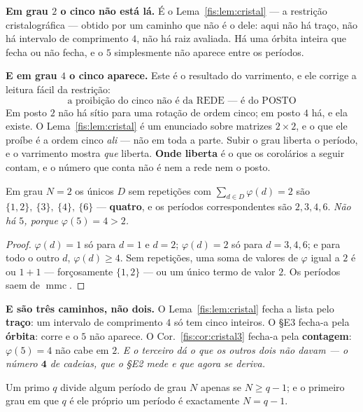 \documentclass[livro.tex]{subfiles}
\begin{document}
\medskip\noindent\textbf{Em grau $2$ o cinco não está lá.} É o
Lema~\ref{fis:lem:cristal} --- a restrição cristalográfica --- obtido por um
caminho que não é o dele: aqui não há traço, não há intervalo de comprimento $4$,
não há raiz avaliada. Há uma órbita inteira que fecha ou não fecha, e o $5$
simplesmente não aparece entre os períodos.

\medskip\noindent\textbf{E em grau $4$ o cinco aparece.} Este é o resultado do
varrimento, e ele corrige a leitura fácil da restrição:
\[
\boxed{\;\text{a proibição do cinco não é da REDE --- é do POSTO}\;}
\]
Em posto $2$ não há sítio para uma rotação de ordem cinco; em posto $4$ há, e ela
existe. O Lema~\ref{fis:lem:cristal} é um enunciado sobre matrizes
$2\times2$, e o que ele proíbe é a ordem cinco \emph{ali} --- não em toda a
parte. Subir o grau liberta o período, e o varrimento mostra \emph{que} liberta.
\textbf{Onde liberta} é o que os corolários a seguir contam, e o número que
conta não é nem a rede nem o posto.

\begin{corolario}\label{fis:cor:cristal3}
Em grau $N=2$ os únicos $D$ sem repetições com $\sum_{d\in D}\varphi(d)=2$ são
$\{1,2\},\ \{3\},\ \{4\},\ \{6\}$ --- \textbf{quatro}, e os períodos
correspondentes são $2,3,4,6$. \emph{Não há $5$, porque $\varphi(5)=4>2$.}
\end{corolario}

\begin{proof}
$\varphi(d)=1$ só para $d=1$ e $d=2$; $\varphi(d)=2$ só para $d=3,4,6$; e para
todo o outro $d$, $\varphi(d)\ge4$. Sem repetições, uma soma de valores de
$\varphi$ igual a $2$ é ou $1+1$ --- forçosamente $\{1,2\}$ --- ou um único termo
de valor $2$. Os períodos saem de $\operatorname{mmc}$.
\end{proof}

\medskip\noindent\textbf{E são três caminhos, não dois.} O
Lema~\ref{fis:lem:cristal} fecha a lista pelo \textbf{traço}: um intervalo de
comprimento $4$ só tem cinco inteiros. O §E3 fecha-a pela \textbf{órbita}: corre
e o $5$ não aparece. O Cor.~\ref{fis:cor:cristal3} fecha-a pela
\textbf{contagem}: $\varphi(5)=4$ não cabe em $2$. \emph{E o terceiro dá o que os
outros dois não davam --- o número $\mathbf{4}$ de cadeias, que o §E2 mede e que
agora se deriva.}

\begin{corolario}\label{fis:cor:entra}
Um primo $q$ divide algum período de grau $N$ apenas se $N\ge q-1$; e o primeiro
grau em que $q$ é ele próprio um período é exactamente $N=q-1$.
\end{corolario}
\end{document}
